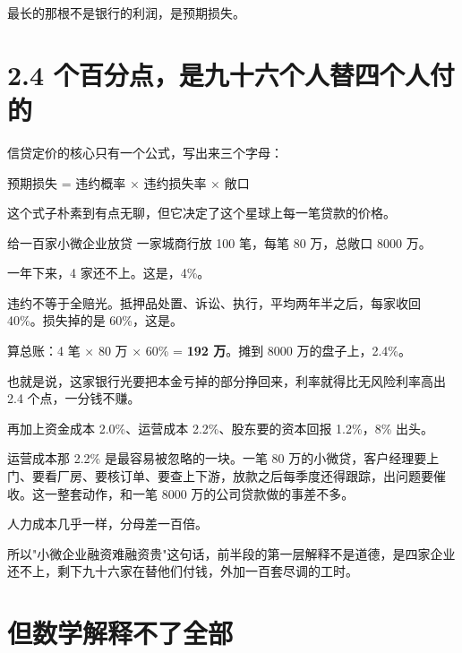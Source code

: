 \begin{barfig}
\end{barfig}

最长的那根不是银行的利润，是预期损失。

\section{2.4 个百分点，是九十六个人替四个人付的}

信贷定价的核心只有一个公式，写出来三个字母：

\begin{pullquote}{}
预期损失 = 违约概率 × 违约损失率 × 敞口
\end{pullquote}

这个式子朴素到有点无聊，但它决定了这个星球上每一笔贷款的价格。

\begin{egbox}{给一百家小微企业放贷}
一家城商行放 100 笔，每笔 80 万，总敞口 8000 万。

一年下来，4 家还不上。这是，4\%。

违约不等于全赔光。抵押品处置、诉讼、执行，平均两年半之后，每家收回 40\%。损失掉的是 60\%，这是。

算总账：4 笔 × 80 万 × 60\% = \textbf{192 万}。摊到 8000 万的盘子上，2.4\%。

也就是说，这家银行光要把本金亏掉的部分挣回来，利率就得比无风险利率高出 2.4 个点，一分钱不赚。

再加上资金成本 2.0\%、运营成本 2.2\%、股东要的资本回报 1.2\%，8\% 出头。

\end{egbox}

运营成本那 2.2\% 是最容易被忽略的一块。一笔 80 万的小微贷，客户经理要上门、要看厂房、要核订单、要查上下游，放款之后每季度还得跟踪，出问题要催收。这一整套动作，和一笔 8000 万的公司贷款做的事差不多。

人力成本几乎一样，分母差一百倍。

所以"小微企业融资难融资贵"这句话，前半段的第一层解释不是道德，是四家企业还不上，剩下九十六家在替他们付钱，外加一百套尽调的工时。

\section{但数学解释不了全部}

